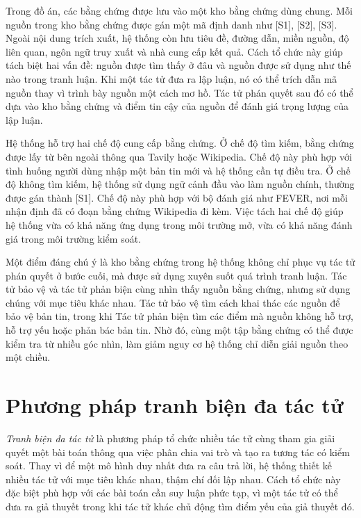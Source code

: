 ﻿\documentclass[oneside,a4paper,12pt]{extreport}
\begin{document}
Trong đồ án, các bằng chứng được lưu vào một kho bằng chứng dùng chung. Mỗi nguồn trong kho bằng chứng được gán một mã định danh như [S1], [S2], [S3]. Ngoài nội dung trích xuất, hệ thống còn lưu tiêu đề, đường dẫn, miền nguồn, độ liên quan, ngôn ngữ truy xuất và nhà cung cấp kết quả. Cách tổ chức này giúp tách biệt hai vấn đề: nguồn được tìm thấy ở đâu và nguồn được sử dụng như thế nào trong tranh luận. Khi một tác tử đưa ra lập luận, nó có thể trích dẫn mã nguồn thay vì trình bày nguồn một cách mơ hồ. Tác tử phán quyết sau đó có thể dựa vào kho bằng chứng và điểm tin cậy của nguồn để đánh giá trọng lượng của lập luận.

Hệ thống hỗ trợ hai chế độ cung cấp bằng chứng. Ở chế độ tìm kiếm, bằng chứng được lấy từ bên ngoài thông qua Tavily hoặc Wikipedia. Chế độ này phù hợp với tình huống người dùng nhập một bản tin mới và hệ thống cần tự điều tra. Ở chế độ không tìm kiếm, hệ thống sử dụng ngữ cảnh đầu vào làm nguồn chính, thường được gán thành [S1]. Chế độ này phù hợp với bộ đánh giá như FEVER, nơi mỗi nhận định đã có đoạn bằng chứng Wikipedia đi kèm. Việc tách hai chế độ giúp hệ thống vừa có khả năng ứng dụng trong môi trường mở, vừa có khả năng đánh giá trong môi trường kiểm soát.

Một điểm đáng chú ý là kho bằng chứng trong hệ thống không chỉ phục vụ tác tử phán quyết ở bước cuối, mà được sử dụng xuyên suốt quá trình tranh luận. Tác tử bảo vệ và tác tử phản biện cùng nhìn thấy nguồn bằng chứng, nhưng sử dụng chúng với mục tiêu khác nhau. Tác tử bảo vệ tìm cách khai thác các nguồn để bảo vệ bản tin, trong khi Tác tử phản biện tìm các điểm mà nguồn không hỗ trợ, hỗ trợ yếu hoặc phản bác bản tin. Nhờ đó, cùng một tập bằng chứng có thể được kiểm tra từ nhiều góc nhìn, làm giảm nguy cơ hệ thống chỉ diễn giải nguồn theo một chiều.

\section{Phương pháp tranh biện đa tác tử}

\textit{Tranh biện đa tác tử} là phương pháp tổ chức nhiều tác tử cùng tham gia giải quyết một bài toán thông qua việc phân chia vai trò và tạo ra tương tác có kiểm soát. Thay vì để một mô hình duy nhất đưa ra câu trả lời, hệ thống thiết kế nhiều tác tử với mục tiêu khác nhau, thậm chí đối lập nhau. Cách tổ chức này đặc biệt phù hợp với các bài toán cần suy luận phức tạp, vì một tác tử có thể đưa ra giả thuyết trong khi tác tử khác chủ động tìm điểm yếu của giả thuyết đó.
\end{document}
